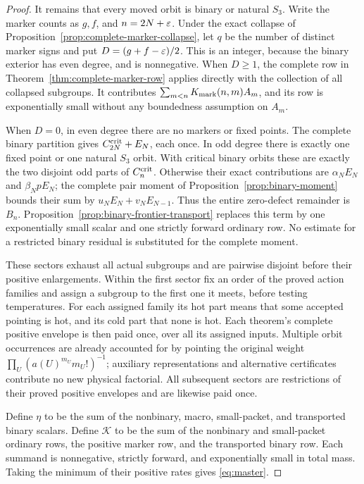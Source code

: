 \begin{proof}
It remains that every moved orbit is binary or natural $S_3$.
Write the marker counts as $g,f$, and $n=2N+\varepsilon$. Under the
exact collapse of Proposition~\ref{prop:complete-marker-collapse},
let $q$ be the number of distinct marker signs and put
$D=(g+f-\varepsilon)/2$. This is an integer, because the binary exterior
has even degree, and is nonnegative. When $D\geq1$, the complete
row in Theorem~\ref{thm:complete-marker-row} applies directly with
the collection of all collapsed subgroups.  It contributes
$\sum_{m<n}K_{\rm mark}(n,m)A_m$, and its row is exponentially
small without any boundedness assumption on $A_m$.

When $D=0$, in even degree there are no markers or fixed points.
The complete binary partition gives $C_{2N}^{\mathrm{crit}}+E_N$, each
once. In odd degree there is exactly one fixed point or one
natural $S_3$ orbit. With critical binary orbits these are exactly
the two disjoint odd parts of $C_n^{\mathrm{crit}}$. Otherwise their exact
contributions are $\alpha_NE_N$ and $\beta_NpE_N$; the complete
pair moment of Proposition~\ref{prop:binary-moment} bounds their
sum by $u_NE_N+v_NE_{N-1}$. Thus the entire zero-defect remainder
is $B_n$. Proposition~\ref{prop:binary-frontier-transport} replaces
this term by one exponentially small scalar and one strictly forward
ordinary row. No estimate for a restricted binary residual is
substituted for the complete moment.

These sectors exhaust all actual subgroups and are pairwise
disjoint before their positive enlargements. Within the first
sector fix an order of the proved action families and assign a
subgroup to the first one it meets, before testing temperatures.
For each assigned family its hot part means that some accepted
pointing is hot, and its cold part that none is hot. Each theorem's
complete positive envelope is then paid once, over all its
assigned inputs. Multiple orbit occurrences are already accounted
for by pointing the original weight
$\prod_U(a(U)^{m_U}m_U!)^{-1}$; auxiliary representations and
alternative certificates contribute no new physical factorial.
All subsequent sectors are restrictions of their proved positive
envelopes and are likewise paid once.

Define $\eta$ to be the sum of the nonbinary, macro, small-packet,
and transported binary scalars. Define $\mathcal K$ to be the sum
of the nonbinary and small-packet ordinary rows, the positive marker
row, and the transported binary row. Each summand is nonnegative,
strictly forward, and exponentially small in total mass. Taking the
minimum of their positive rates gives \eqref{eq:master}.
\end{proof}

